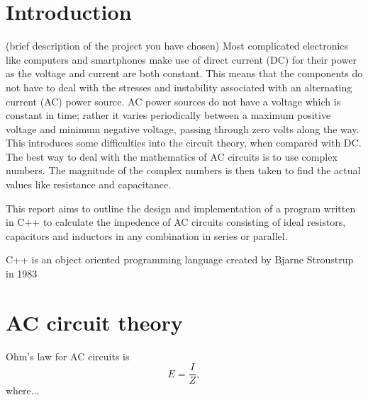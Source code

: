 \section{Introduction}
\label{sec:introduction}

(brief description of the project you have chosen)
\cite{ref:example}
Most complicated electronics like computers and smartphones make use of direct current (DC) for their power as the voltage and current are both constant. This means that the components do not have to deal with the stresses and instability associated with an alternating current (AC) power source. AC power sources do not have a voltage which is constant in time; rather it varies periodically between a maximum positive voltage and minimum negative voltage, passing through zero volts along the way. This introduces some difficulties into the circuit theory, when compared with DC. The best way to deal with the mathematics of AC circuits is to use complex numbers. The magnitude of the complex numbers is then taken to find the actual values like resistance and capacitance.

This report aims to outline the design and implementation of a program written in C++ to calculate the impedence of AC circuits consisting of ideal resistors, capacitors and inductors in any combination in series or parallel.

C++ is an object oriented programming language created by Bjarne Stroustrup in 1983

  \cite{ref:3}

\section*{AC circuit theory}
  Ohm's law for AC circuits is
  \begin{equation}\label{eqn:1}
    E=\frac{I}{Z},
  \end{equation}
  where...\cite{ref:4}
